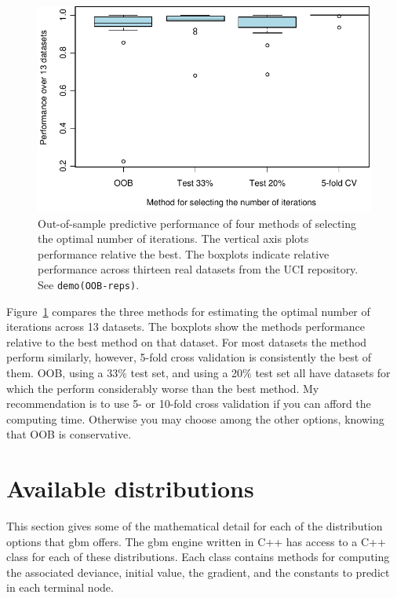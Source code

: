 \documentclass{article}
\begin{document}
\begin{figure}[ht] 
\begin{center} 
\includegraphics[width=5in]{oobperf2} 
\end{center} 
\caption{Out-of-sample predictive performance of four methods of selecting the optimal number of iterations. The vertical axis plots performance relative the best. The boxplots indicate relative performance across thirteen real datasets from the UCI repository. See \texttt{demo(OOB-reps)}.} 
\label{fig:oobperf} 
\end{figure}

Figure~\ref{fig:oobperf} compares the three methods for estimating the
optimal number of iterations across 13 datasets. The boxplots show the
methods performance relative to the best method on that dataset. For
most datasets the method perform similarly, however, 5-fold cross
validation is consistently the best of them. OOB, using a 33\% test
set, and using a 20\% test set all have datasets for which the perform
considerably worse than the best method. My recommendation is to use
5- or 10-fold cross validation if you can afford the computing
time. Otherwise you may choose among the other options, knowing that
OOB is conservative.

\section{Available distributions}

This section gives some of the mathematical detail for each of the
distribution options that gbm offers. The gbm engine written in C++
has access to a C++ class for each of these distributions. Each class
contains methods for computing the associated deviance, initial value,
the gradient, and the constants to predict in each terminal node.
\end{document}
